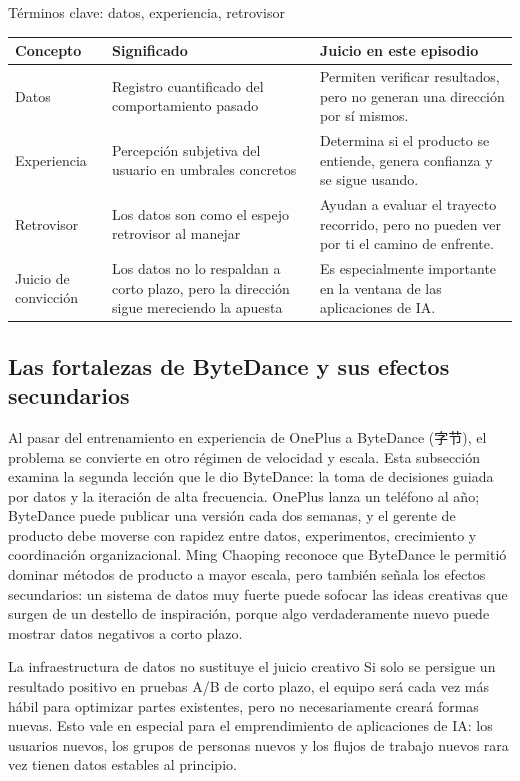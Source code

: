 \documentclass[a4paper]{article}
\begin{document}
\begin{knowledgebox}{Términos clave: datos, experiencia, retrovisor}
\noindent\begin{tabularx}{\textwidth}{p{}p{}X}
\toprule
Concepto & Significado & Juicio en este episodio \\
\midrule
Datos & Registro cuantificado del comportamiento pasado & Permiten verificar resultados, pero no generan una dirección por sí mismos. \\
Experiencia & Percepción subjetiva del usuario en umbrales concretos & Determina si el producto se entiende, genera confianza y se sigue usando. \\
Retrovisor & Los datos son como el espejo retrovisor al manejar & Ayudan a evaluar el trayecto recorrido, pero no pueden ver por ti el camino de enfrente. \\
Juicio de convicción & Los datos no lo respaldan a corto plazo, pero la dirección sigue mereciendo la apuesta & Es especialmente importante en la ventana de las aplicaciones de IA. \\
\bottomrule
\end{tabularx}
\end{knowledgebox}

\subsection{Las fortalezas de ByteDance y sus efectos secundarios}

Al pasar del entrenamiento en experiencia de OnePlus a ByteDance (字节), el problema se convierte en otro régimen de velocidad y escala. Esta subsección examina la segunda lección que le dio ByteDance: la toma de decisiones guiada por datos y la iteración de alta frecuencia. OnePlus lanza un teléfono al año; ByteDance puede publicar una versión cada dos semanas, y el gerente de producto debe moverse con rapidez entre datos, experimentos, crecimiento y coordinación organizacional. Ming Chaoping reconoce que ByteDance le permitió dominar métodos de producto a mayor escala, pero también señala los efectos secundarios: un sistema de datos muy fuerte puede sofocar las ideas creativas que surgen de un destello de inspiración, porque algo verdaderamente nuevo puede mostrar datos negativos a corto plazo.

\begin{warningbox}{La infraestructura de datos no sustituye el juicio creativo}
Si solo se persigue un resultado positivo en pruebas A/B de corto plazo, el equipo será cada vez más hábil para optimizar partes existentes, pero no necesariamente creará formas nuevas. Esto vale en especial para el emprendimiento de aplicaciones de IA: los usuarios nuevos, los grupos de personas nuevos y los flujos de trabajo nuevos rara vez tienen datos estables al principio.
\end{warningbox}
\end{document}

